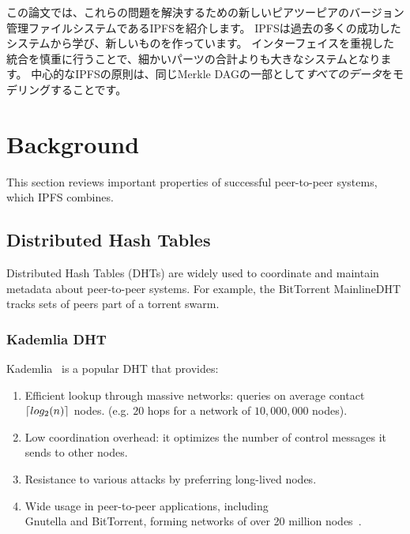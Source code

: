 \documentclass{sig-alternate}
\DeclarePairedDelimiter{\ceil}{\lceil}{\rceil}
\begin{document}
この論文では、これらの問題を解決するための新しいピアツーピアのバージョン管理ファイルシステムであるIPFSを紹介します。 IPFSは過去の多くの成功したシステムから学び、新しいものを作っています。 インターフェイスを重視した統合を慎重に行うことで、細かいパーツの合計よりも大きなシステムとなります。 中心的なIPFSの原則は、同じMerkle DAGの一部として\textit {すべてのデータ}をモデリングすることです。



\section{Background}

This section reviews important properties of successful peer-to-peer systems, which IPFS combines.

\subsection{Distributed Hash Tables}

Distributed Hash Tables (DHTs) are widely used to coordinate and maintain metadata about peer-to-peer systems. For example, the BitTorrent MainlineDHT tracks sets of peers part of a torrent swarm.

\subsubsection{Kademlia DHT}

Kademlia~\cite{maymounkov02} is a popular DHT that provides:

\begin{enumerate}

  \item Efficient lookup through massive networks:
        queries on average contact $ \ceil{log_2 (n)} $ nodes.
        (e.g. $20$ hops for a network of $10,000,000$ nodes).

  \item Low coordination overhead: it optimizes the number of
        control messages it sends to other nodes.

  \item Resistance to various attacks by preferring long-lived nodes.

  \item Wide usage in peer-to-peer applications, including \\
        Gnutella and BitTorrent, forming networks of over 20 million nodes~\cite{wang13}.

 \end{enumerate}
\end{document}
